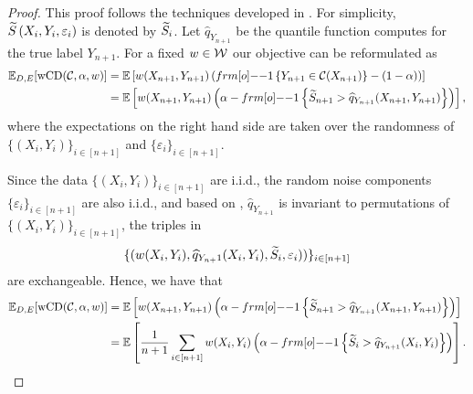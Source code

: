 \begin{proof}
   This proof follows the techniques developed in \cite{GCC2023}. For simplicity, ${\widetilde{S}}\left(X_i,Y_i, \varepsilon_i\right)$ is denoted by ${\widetilde{S}}_i$. 
    Let $\hat{q}_{Y_{n+1}}$ be the quantile function  computes for the true label $Y_{n+1}$. For a fixed $w \in {\cal W}$ our objective can be reformulated as
    \begin{align*}
        \EE_{D,E}[\wcovdev(\calC, \alpha, w)] &= \EE\left[ w(X_{n+1},Y_{n+1})\left( \11\left\{ Y_{n+1} \in \calC(X_{n+1})\right\}-(1-\alpha)\right)\right]\\
        & =\EE \left[ w(X_{n+1},Y_{n+1})\left( \alpha - \11\left\{\tS_{n+1} > \hat{q}_{Y_{n+1}}(X_{n+1},Y_{n+1})\right\}\right)\right],
    \end{align*}
    where the expectations on the right hand side are taken over the randomness of $\{(X_i,Y_i)\}_{i\in [n+1]}$ and $\{\varepsilon_i\}_{i\in [n+1]}$.
    
    Since the data $\{(X_i,Y_i)\}_{i \in [n+1]}$ are \mbox{i.i.d.}, the random noise components $\{\varepsilon_i\}_{i \in [n+1]}$ are also \mbox{i.i.d.}, and based on , $\hat{q}_{Y_{n+1}}$ is invariant to permutations of $\{(X_i,Y_i)\}_{i \in [n+1]}$, the triples in \[\{(w(X_i,Y_i), \widehat{q}_{Y_{n+}1}(X_i,Y_i), {\widetilde{S}}_i,\varepsilon_i))\}_{i \in [n+1]}\] are exchangeable. Hence, we have that
    \begin{align*}
     \EE_{D,E}[\wcovdev(\calC, \alpha, w)] &=\EE\left[ w(X_{n+1},Y_{n+1})\left( \alpha - \11\left\{\tS_{n+1}> \hat{q}_{Y_{n+1}}(X_{n+1},Y_{n+1})\right\}\right)\right] \\
     &=\EE \left[\frac{1}{n+1}\sum_{i \in [n+1]} w(X_i,Y_i)\left( \alpha - \11\left\{\tS_i > \hat{q}_{Y_{n+1}}(X_i,Y_i)\right\}\right)\right].
    \end{align*}
    

\end{proof}
